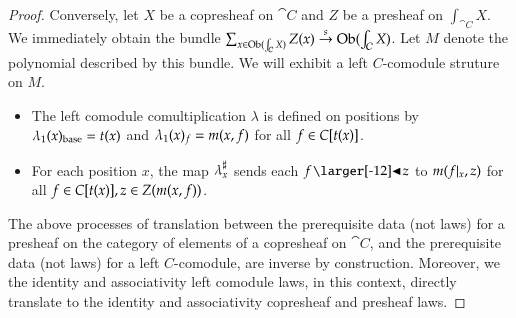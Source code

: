 \documentclass{amsart}
\begin{document}
\begin{proof}
  Conversely, let $X$ be a copresheaf on $\cat{C}$ and $Z$ be a
  presheaf on $\int_{\cat{C}}X$. We immediately obtain the bundle
  ${\sum_{x \in \operatorname{Ob}(\int_{\mathcal{C}}X)}Z(x) \overset{s}{\to}
    \operatorname{Ob}(\int_{\mathcal{C}}X)}$. Let $M$ denote the polynomial described by
  this bundle. We will exhibit a left $C$-comodule struture on $M$.
  \begin{itemize}
  \item The left comodule comultiplication $\lambda$ is defined on
    positions by ${\lambda}_1(x)_{\mathrm{base}} = t(x)$ and
    ${\lambda}_1(x)_f = m(x,f)$ for all ${f \in C[t(x)]}$.
  \item For each position $x$, the map ${\lambda}^\sharp_{x}$ sends each
    $f \subd z$ to $m(f|_{x}, z)$ for all
    ${f \in C[t(x)]}, {z \in Z(m(x,f))}$.
  \end{itemize}

  The above processes of translation between the prerequisite data
  (not laws) for a presheaf on the category of elements of a
  copresheaf on $\cat{C}$, and the prerequisite data (not laws) for a
  left $C$-comodule, are inverse by construction. Moreover, we the
  identity and associativity left comodule laws, in this context,
  directly translate to the identity and associativity copresheaf and
  presheaf laws.
\end{proof}
\end{document}
